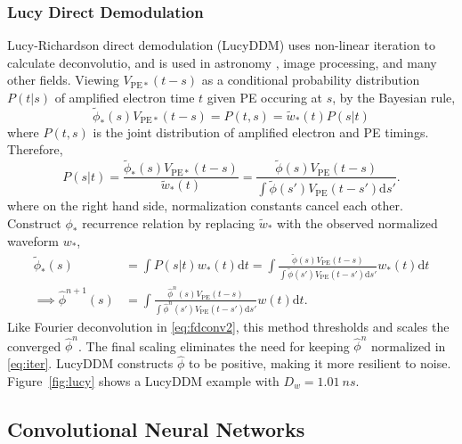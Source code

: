 \subsubsection{Lucy Direct Demodulation}

Lucy-Richardson direct demodulation (LucyDDM) uses non-linear iteration to calculate deconvolutio, and is used in astronomy \cite{li_richardson-lucy_2019}, image processing, and many other fields.  Viewing $V_{\mathrm{PE}*}(t-s)$ as a conditional probability distribution $P(t|s)$ of amplified electron time $t$ given PE occuring at $s$, by the Bayesian rule,
\begin{equation}
  \label{eq:lucy}
  \tilde{\phi}_*(s) V_{\mathrm{PE}*}(t-s) = P(t,s) = \tilde{w}_*(t)P(s|t)
\end{equation}
where $P(t,s)$ is the joint distribution of amplified electron and PE timings.  Therefore,
\begin{equation}
  \label{eq:ptt}
  P(s|t) = \frac{\tilde{\phi}_*(s) V_{\mathrm{PE}*}(t-s)}{\tilde{w}_*(t)} = \frac{\tilde{\phi}(s) V_{\mathrm{PE}}(t-s)}{\int\tilde{\phi}(s') V_{\mathrm{PE}}(t-s')\mathrm{d}s'}.
\end{equation}
where on the right hand side, normalization constants cancel each other. Construct $\phi_*$ recurrence relation by replacing $\tilde{w}_*$ with the observed normalized waveform $w_*$,
\begin{equation}
  \label{eq:iter}
  \begin{aligned}
    \tilde{\phi}_*(s) & = \int P(s|t) w_*(t)\mathrm{d}t =  \int \frac{\tilde{\phi}(s) V_{\mathrm{PE}}(t-s)}{\int\tilde{\phi}(s') V_{\mathrm{PE}}(t-s')\mathrm{d}s'} w_*(t) \mathrm{d}t \\
    \implies \hat{\phi}^{n+1}(s) & = \int \frac{\hat{\phi}^n(s) V_{\mathrm{PE}}(t-s)}{\int\hat{\phi}^n(s') V_{\mathrm{PE}}(t-s')\mathrm{d}s'} w(t) \mathrm{d}t.
  \end{aligned}
\end{equation}
Like Fourier deconvolution in \eqref{eq:fdconv2}, this method thresholds and scales the converged $\hat{\phi}^{n}$.  The final scaling eliminates the need for keeping $\hat{\phi}^{n}$ normalized in \eqref{eq:iter}.  LucyDDM constructs $\hat{\phi}$ to be positive, making it more resilient to noise.  Figure~\ref{fig:lucy} shows a LucyDDM example with $D_w = \SI{1.01}{ns}$.

\subsection{Convolutional Neural Networks}

